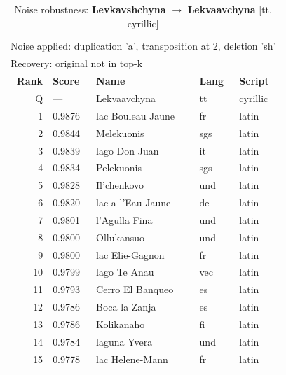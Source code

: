 \begin{table}[htbp]
\centering
\small
\caption{Noise robustness: \textbf{Levkavshchyna} $\rightarrow$ \textbf{Lekvaavchyna} [tt, cyrillic]}
\label{tab:noise-13}
\begin{tabular}{rllll}
\toprule
\multicolumn{5}{l}{\small Noise applied: duplication 'a', transposition at 2, deletion 'sh'} \\
\multicolumn{5}{l}{\small Recovery: original not in top-k} \\
\midrule
\textbf{Rank} & \textbf{Score} & \textbf{Name} & \textbf{Lang} & \textbf{Script} \\
\midrule
\rowcolor{gray!20} Q & --- & Lekvaavchyna & tt & cyrillic \\
\midrule
1 & 0.9876 & lac Bouleau Jaune & fr & latin \\
2 & 0.9844 & Melekuonis & sgs & latin \\
3 & 0.9839 & lago Don Juan & it & latin \\
4 & 0.9834 & Pelekuonis & sgs & latin \\
5 & 0.9828 & Il'chenkovo & und & latin \\
6 & 0.9820 & lac a l'Eau Jaune & de & latin \\
7 & 0.9801 & l'Agulla Fina & und & latin \\
8 & 0.9800 & Ollukansuo & und & latin \\
9 & 0.9800 & lac Elie-Gagnon & fr & latin \\
10 & 0.9799 & lago Te Anau & vec & latin \\
11 & 0.9793 & Cerro El Banqueo & es & latin \\
12 & 0.9786 & Boca la Zanja & es & latin \\
13 & 0.9786 & Kolikanaho & fi & latin \\
14 & 0.9784 & laguna  Yvera & und & latin \\
15 & 0.9778 & lac Helene-Mann & fr & latin \\
\bottomrule
\end{tabular}
\end{table}

